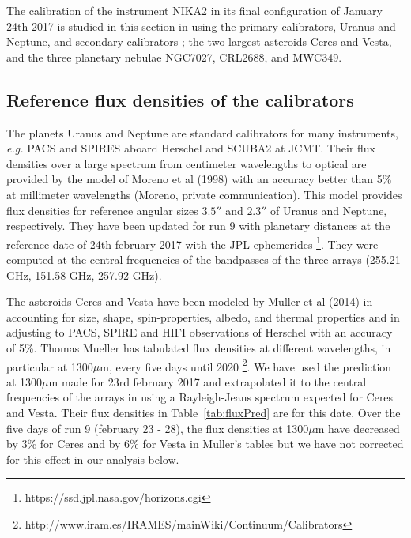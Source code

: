 %


The calibration of the instrument NIKA2 in its final configuration
of January 24th 2017  is studied in this section  in using the 
 primary calibrators, Uranus and Neptune, and secondary calibrators ; the two largest asteroids Ceres and Vesta, and the three
planetary nebulae NGC7027, CRL2688, and MWC349.

\subsection{Reference flux densities of the calibrators}

The planets Uranus and Neptune are standard calibrators for many instruments,
{\it e.g.} PACS and SPIRES aboard Herschel and SCUBA2 at JCMT.
Their flux densities over a large spectrum from centimeter wavelengths to optical
are provided by the model of Moreno et al (1998) with an accuracy better than
5\% at millimeter wavelengths (Moreno, private communication). This model provides
flux densities for reference angular sizes $3.5''$
and $2.3''$ of Uranus and Neptune, respectively. They have been updated for run 9
with planetary distances at the reference date of 24th february 2017 with 
the JPL ephemerides \footnote{https://ssd.jpl.nasa.gov/horizons.cgi}.
They were computed at the central frequencies of the bandpasses of
the three arrays (255.21 GHz, 151.58 GHz, 257.92 GHz).

The asteroids Ceres and Vesta have been modeled by Muller et al (2014) in accounting for 
size, shape, spin-properties, albedo, and thermal properties and in adjusting to PACS, SPIRE and HIFI observations
of Herschel with an accuracy of 5\%. 
Thomas Mueller has tabulated flux densities at different wavelengths, in particular at 1300$\mu$m, every five days
until 2020 \footnote{http://www.iram.es/IRAMES/mainWiki/Continuum/Calibrators}.
We have used the prediction at  1300$\mu$m made for  23rd february 2017
and extrapolated it  to the central frequencies of the arrays in using a Rayleigh-Jeans
spectrum expected for Ceres and Vesta. Their flux densities in
Table~\ref{tab:fluxPred} are for this date. Over the five days of  run 9 (february 23 - 28), the
flux densities  at 1300$\mu$m  have decreased by  3\% 
for Ceres and  by 6\%  for Vesta in Muller's tables but we have not corrected for this effect in our analysis below.  

